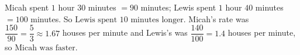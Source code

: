 Micah spent $1$ hour $30$ minutes $=90$ minutes; Lewis spent $1$ hour $40$ minutes $=100$ minutes. So $\boxed{\text{Lewis spent }10\text{ minutes longer}}$. Micah's rate was $\dfrac{150}{90}=\dfrac53\approx1.67$ houses per minute and Lewis's was $\dfrac{140}{100}=1.4$ houses per minute, so $\boxed{\text{Micah was faster}}$.
